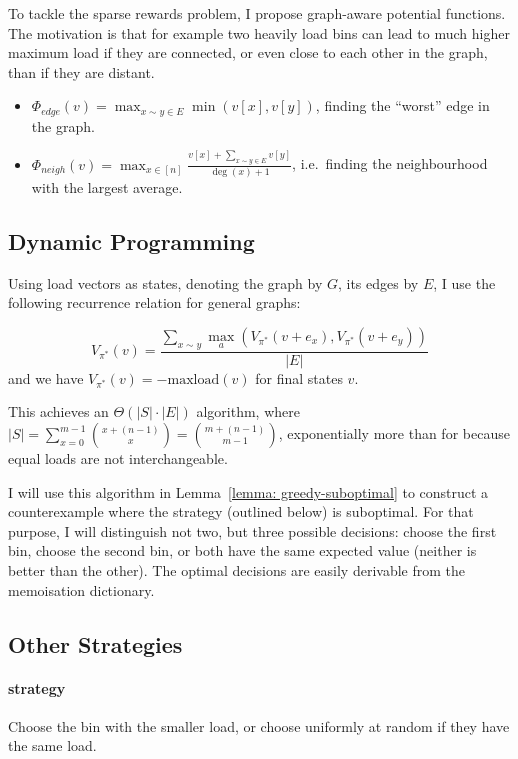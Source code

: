 To tackle the sparse rewards problem, I propose graph-aware potential functions. The motivation is that for example two heavily load bins can lead to much higher maximum load if they are connected, or even close to each other in the graph, than if they are distant.


\begin{itemize}
    \item 
    $\Phi_{edge}(v)=\max_{x\sim y \in E} \min(v[x], v[y])$, finding the ``worst'' edge in the graph.
    \item
    $\Phi_{neigh}(v)=\max_{x \in [n]} \frac{v[x]+\sum_{x\sim y \in E}v[y]}{\deg(x)+1}$, i.e.\ finding the neighbourhood with the largest average.
\end{itemize}


\subsection{Dynamic Programming}

Using load vectors as states, denoting the graph by $G$, its edges by $E$, I use the following recurrence relation for general graphs:


\begin{equation} \label{eq:graphicaltwochoice-dynamicprogramming}
    V_{\pi^*}(v) = \frac{\sum_{x\sim y}\max_a (V_{\pi^*}(v+e_x), V_{\pi^*}(v+e_y))}{|E|}
\end{equation}
and we have $V_{\pi^*}(v)=-\mathrm{maxload}(v)$ for final states $v$.

This achieves an $\Theta(|S|\cdot |E|)$ algorithm, where $|S| = \sum_{x=0}^{m-1} {{x+(n-1)} \choose {x}} = {{m+(n-1)} \choose {m-1}}$, exponentially more than for \TwoThinning because equal loads are not interchangeable.

I will use this algorithm in Lemma~\ref{lemma: greedy-suboptimal} to construct a counterexample where the \Greedy strategy (outlined below) is suboptimal. For that purpose, I will distinguish not two, but three possible decisions: choose the first bin, choose the second bin, or both have the same expected value (neither is better than the other). The optimal decisions are easily derivable from the memoisation dictionary.


\subsection{Other Strategies} \label{graphical-otherstrategies}


\paragraph{\Greedy strategy} Choose the bin with the smaller load, or choose uniformly at random if they have the same load.


